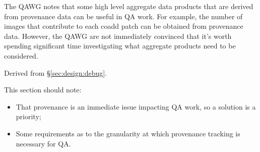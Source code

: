 The QAWG notes that some high level aggregate data products that
are derived from provenance data can be useful in QA work.  For
example, the number of images that contribute to each coadd patch
can be obtained from provenance data.  However, the QAWG are not
immediately convinced that it's worth spending significant time
investigating what aggregate products need to be considered.

Derived from \S\ref{sec:design:debug}.

This section should note:

\begin{itemize}

  \item{That provenance is an immediate issue impacting QA work, so a solution
  is a priority;}

  \item{Some requirements as to the granularity at which provenance tracking
  is necessary for QA.}

\end{itemize}
